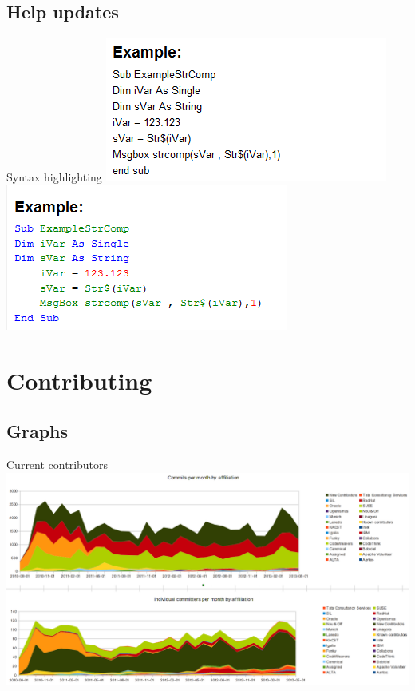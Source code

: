 \documentclass{beamer}
\begin{document}
\subsection{Help updates}

\begin{frame}{Syntax highlighting}
	\includegraphics[width= 0.5\linewidth]{syntax36-help.png}
	\includegraphics[width= 0.5\linewidth]{syntax41-help.png}
\end{frame}

\section{Contributing}

\subsection{Graphs}

\begin{frame}{Current contributors}
	\includegraphics[width= 1.0\linewidth]{contribution-graph.png}
\end{frame}
\end{document}
